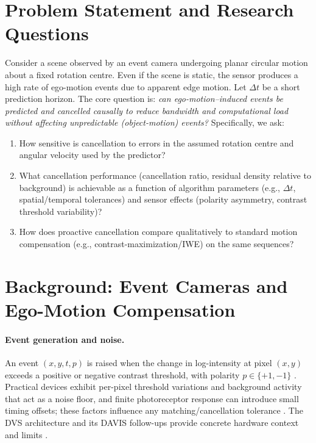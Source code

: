 \section{Problem Statement and Research Questions}

Consider a scene observed by an event camera undergoing planar circular motion about a fixed rotation centre. Even if the scene is static, the sensor produces a high rate of ego-motion events due to apparent edge motion. Let $\Delta t$ be a short prediction horizon. The core question is: \emph{can ego-motion–induced events be predicted and cancelled causally to reduce bandwidth and computational load without affecting unpredictable (object-motion) events?} Specifically, we ask:
\begin{enumerate}
    \item How sensitive is cancellation to errors in the assumed rotation centre and angular velocity used by the predictor? \cite{Gallego2017Angular,Gallego2018CMax}
    \item What cancellation performance (cancellation ratio, residual density relative to background) is achievable as a function of algorithm parameters (e.g., $\Delta t$, spatial/temporal tolerances) and sensor effects (polarity asymmetry, contrast threshold variability)? \cite{Gallego2020Survey,Xu2020TCI}
    \item How does proactive cancellation compare qualitatively to standard motion compensation (e.g., contrast-maximization/IWE) on the same sequences? \cite{Gallego2018CMax,Bardow2016SOFIE,Stoffregen2019Segmentation}
\end{enumerate}

\section{Background: Event Cameras and Ego-Motion Compensation}

\paragraph{Event generation and noise.}
An event $(x,y,t,p)$ is raised when the change in log-intensity at pixel $(x,y)$ exceeds a positive or negative contrast threshold, with polarity $p \in \{+1,-1\}$ \cite{Gallego2020Survey}. Practical devices exhibit per-pixel threshold variations and background activity that act as a noise floor, and finite photoreceptor response can introduce small timing offsets; these factors influence any matching/cancellation tolerance \cite{Gallego2020Survey}. The DVS architecture and its DAVIS follow-ups provide concrete hardware context and limits \cite{Lichtsteiner2008DVS,Brandli2014DAVIS}.

